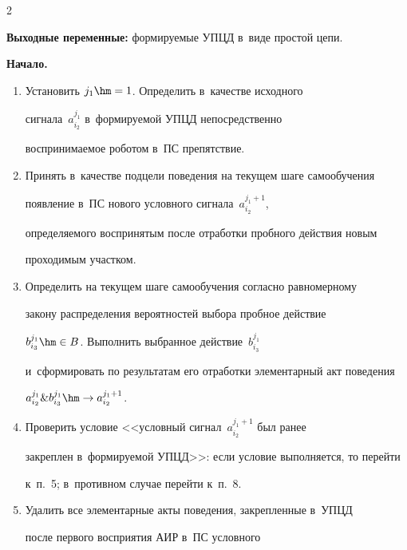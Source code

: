 \begin{multicols}{2}
  


 \noindent


  \textbf{Выходные переменные:} фор\-ми\-ру\-емые УПЦД в~виде прос\-той цепи. 


  


\smallskip


  


 \noindent


  \textbf{Начало.}\\[-12pt]


  \begin{enumerate}[1.]


\item  Установить $j_1\hm=1$. Определить в~качестве исходного 


сигнала~$a_{i_2}^{j_1}$ в~фор\-ми\-ру\-емой УПЦД непосредственно 


воспринимаемое роботом в~ПС препятствие. 


  \item  Принять в~качестве подцели поведения на текущем шаге самообучения 


появление в~ПС нового условного сигнала~$a_{i_2}^{j_1+1}$, 


опре\-де\-ля\-емо\-го воспринятым после отработки проб\-но\-го действия новым 


проходимым участ\-ком. 


  \item  Определить на текущем шаге самообучения согласно равномерному 


закону распределения вероятностей выбора проб\-ное действие 


$b^{j_1}_{i_3}\hm\in B$. Выполнить выбранное действие~$b^{j_1}_{i_3}$ 


и~сформировать по результатам его отработки элементарный акт поведения 


$a_{i_2}^{j_1} \& b^{j_1}_{i_3}\hm\to a_{i_2}^{j_1+1}$.


  \item  Проверить условие <<услов\-ный сигнал~$a_{i_2}^{j_1+1}$ был ранее 


закреплен в~формируемой УПЦД>>: если условие выполняется, то перейти 


к~п.~5; в~противном случае перейти к~п.~8.


  \item  Удалить все элементарные акты поведения, за\-креп\-лен\-ные в~УПЦД 


после первого восприятия АИР в~ПС услов\-но\-го 



\end{enumerate}
\end{multicols}
